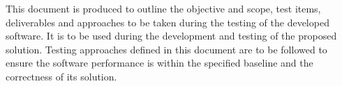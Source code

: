 This document is produced to outline the objective and scope, test items, deliverables and approaches to be taken during the testing of the developed software. It is to be used during the development and testing of the proposed solution. Testing approaches defined in this document are to be followed to ensure the software performance is within the specified baseline and the correctness of its solution.